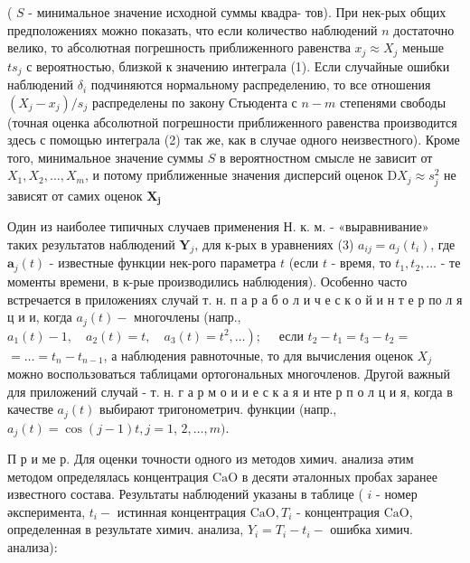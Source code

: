 \documentclass[10pt]{article}
\begin{document}
( $S$ - минимальное значение исходной суммы квадра- тов). При нек-рых общих предположениях можно показать, что если количество наблюдений $n$ достаточно велико, то абсолютная погрешность приближенного равенства $x_{j} \approx X_{j}$ меньше $t s_{j}$ с вероятностью, близкой к значению интеграла (1). Если случайные ошибки наблюдений $\delta_{i}$ подчиняются нормальному распределению, то все отношения $\left(X_{j}-x_{j}\right) / s_{j}$ распределены по закону Стьюдента с $n-m$ степенями свободы (точная оценка абсолютной погрешности приближенного равенства производится здесь с помощью интеграла (2) так же, как в случае одного неизвестного). Кроме того, минимальное значение суммы $S$ в вероятностном смысле не зависит от $X_{1}, X_{2}, \ldots, X_{m}$, и потому приближенные значения дисперсий оценок $\mathrm{D} X_{j} \approx s_{j}^{2}$ не зависят от самих оценок $\boldsymbol{X}_{\boldsymbol{j}}$



Один из наиболее типичных случаев применения Н. к. м. - «выравнивание» таких результатов наблюдений $\boldsymbol{Y}_{j}$, для к-рых в уравнениях (3) $a_{i j}=a_{j}\left(t_{i}\right)$, где $\boldsymbol{a}_{j}(t)$ - известные функции нек-рого параметра $t$ (если $t$ - время, то $t_{1}, t_{2}, \ldots$ - те моменты времени, в к-рые производились наблюдения). Особенно часто встречается в приложениях случай т. н. п а р а б о л и ч е с к о й и н т е р по л я ц и и, когда $a_{j}(t)-$ многочлены (напр., $\left.a_{1}(t)-1, \quad a_{2}(t)=t, \quad a_{3}(t)=t^{2}, \ldots\right) ; \quad$ если $t_{2}-t_{1}=t_{3}-t_{2}=$ $=\ldots=t_{n}-t_{n-1}$, а наблюдения равноточные, то для вычисления оценок $X_{j}$ можно воспользоваться таблицами ортогональных многочленов. Другой важный для приложений случай - т. н. г а р м о и и е с к а я и нте р п о л ц и я, когда в качестве $a_{j}(t)$ выбирают тригонометрич. функции (напр., $a_{j}(t)=\cos (j-1) t, j=1$, $2, \ldots, m)$.



П р и ме р. Для оценки точности одного из методов химич. анализа әтим методом определялась концентрация $\mathrm{CaO}$ в десяти әталонных пробах заранее известного состава. Результаты наблюдений указаны в таблице ( $i$ - номер әксперимента, $t_{i}-$ истинная концентрация $\mathrm{CaO}, T_{i}$ - концентрация $\mathrm{CaO}$, определенная в результате химич. анализа, $Y_{i}=T_{i}-t_{i}-$ ошибка химич. анализа):
\end{document}
